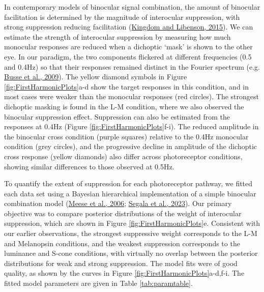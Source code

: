 \documentclass[
]{article}
\begin{document}
In contemporary models of binocular signal combination, the amount of binocular facilitation is determined by the magnitude of interocular suppression, with strong suppression reducing facilitation (\protect\hyperlink{ref-Kingdom2015}{Kingdom and Libenson, 2015}). We can estimate the strength of interocular suppression by measuring how much monocular responses are reduced when a dichoptic `mask' is shown to the other eye. In our paradigm, the two components flickered at different frequencies (0.5 and 0.4Hz) so that their responses remained distinct in the Fourier spectrum (e.g. \protect\hyperlink{ref-Busse2009}{Busse et al., 2009}). The yellow diamond symbols in Figure \ref{fig:FirstHarmonicPlots}a-d show the target responses in this condition, and in most cases were weaker than the monocular responses (red circles). The strongest dichoptic masking is found in the L-M condition, where we also observed the binocular suppression effect. Suppression can also be estimated from the responses at 0.4Hz (Figure \ref{fig:FirstHarmonicPlots}f-i). The reduced amplitude in the binocular cross condition (purple squares) relative to the 0.4Hz monocular condition (grey circles), and the progressive decline in amplitude of the dichoptic cross response (yellow diamonds) also differ across photoreceptor conditions, showing similar differences to those observed at 0.5Hz.

To quantify the extent of suppression for each photoreceptor pathway, we fitted each data set using a Bayesian hierarchical implementation of a simple binocular combination model (\protect\hyperlink{ref-Meese2006}{Meese et al., 2006}; \protect\hyperlink{ref-Segala2023}{Segala et al., 2023}). Our primary objective was to compare posterior distributions of the weight of interocular suppression, which are shown in Figure \ref{fig:FirstHarmonicPlots}e. Consistent with our earlier observations, the strongest suppressive weight corresponds to the L-M and Melanopsin conditions, and the weakest suppression corresponds to the luminance and S-cone conditions, with virtually no overlap between the posterior distributions for weak and strong suppression. The model fits were of good quality, as shown by the curves in Figure \ref{fig:FirstHarmonicPlots}a-d,f-i. The fitted model parameters are given in Table \ref{tab:paramtable}.
\end{document}

